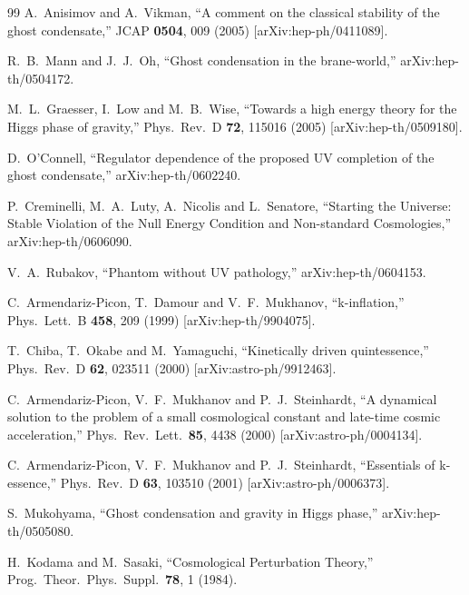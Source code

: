 \begin{thebibliography}{99}
  A.~Anisimov and A.~Vikman,
  ``A comment on the classical stability of the ghost condensate,''
  JCAP {\bf 0504}, 009 (2005)
  [arXiv:hep-ph/0411089].

  R.~B.~Mann and J.~J.~Oh,
  ``Ghost condensation in the brane-world,''
  arXiv:hep-th/0504172.

  M.~L.~Graesser, I.~Low and M.~B.~Wise,
  ``Towards a high energy theory for the Higgs phase of gravity,''
  Phys.\ Rev.\ D {\bf 72}, 115016 (2005)
  [arXiv:hep-th/0509180].

  D.~O'Connell,
  ``Regulator dependence of the proposed UV completion of the ghost
  condensate,''
  arXiv:hep-th/0602240.

  P.~Creminelli, M.~A.~Luty, A.~Nicolis and L.~Senatore,
  ``Starting the Universe: Stable Violation of the Null Energy Condition and
  Non-standard Cosmologies,''
  arXiv:hep-th/0606090.

  V.~A.~Rubakov,
  ``Phantom without UV pathology,''
  arXiv:hep-th/0604153.


  C.~Armendariz-Picon, T.~Damour and V.~F.~Mukhanov,
  ``k-inflation,''
  Phys.\ Lett.\ B {\bf 458}, 209 (1999)
  [arXiv:hep-th/9904075].

  T.~Chiba, T.~Okabe and M.~Yamaguchi,
  ``Kinetically driven quintessence,''
  Phys.\ Rev.\ D {\bf 62}, 023511 (2000)
  [arXiv:astro-ph/9912463].

  C.~Armendariz-Picon, V.~F.~Mukhanov and P.~J.~Steinhardt,
  ``A dynamical solution to the problem of a small cosmological constant  and
  late-time cosmic acceleration,''
  Phys.\ Rev.\ Lett.\  {\bf 85}, 4438 (2000)
  [arXiv:astro-ph/0004134].

  C.~Armendariz-Picon, V.~F.~Mukhanov and P.~J.~Steinhardt,
  ``Essentials of k-essence,''
  Phys.\ Rev.\ D {\bf 63}, 103510 (2001)
  [arXiv:astro-ph/0006373].

  S.~Mukohyama,
  ``Ghost condensation and gravity in Higgs phase,''
  arXiv:hep-th/0505080.

  H.~Kodama and M.~Sasaki,
``Cosmological Perturbation Theory,''
  Prog.\ Theor.\ Phys.\ Suppl.\  {\bf 78}, 1 (1984).


\end{thebibliography}
 



